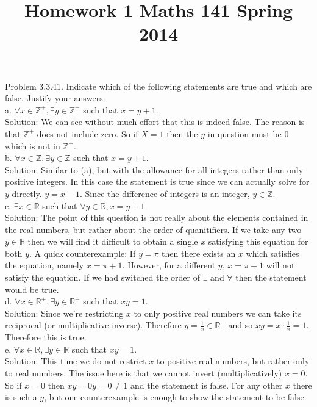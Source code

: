\documentclass[10 pt]{amsart}
\theoremstyle{definition}
\theoremstyle{remark}
\numberwithin{equation}{subsection}
\begin{document}
\title{Homework 1 Maths 141 Spring 2014}
\maketitle 
Problem 3.3.41. Indicate which of the following statements are true and which are false.  Justify your answers.\\

a. $\forall x \in \mathbb{Z}^{+}, \exists y \in \mathbb{Z}^{+}$ such that $x=y+1$.\\
Solution: We can see without much effort that this is indeed false.  The reason is that $\mathbb{Z}^{+}$ does not include zero.  So if $X=1$ then the $y$ in question must be $0$ which is not in $\mathbb{Z}^{+}$.\\

b. $\forall x \in \mathbb{Z}, \exists y \in \mathbb{Z}$ such that $x=y+1$.\\
Solution: Similar to (a), but with the allowance for all integers rather than only positive integers.  In this case the statement is true since we can actually solve for $y$ directly.
$y=x-1$.  Since the difference of integers is an integer, $y\in\mathbb{Z}$.\\

c. $\exists x \in\mathbb{R}$ such that $\forall y\in\mathbb{R}, x=y+1$.\\
Solution: The point of this question is not really about the elements contained in the real numbers, but rather about the order of quanitifiers.  If we take any two $y\in \mathbb{R}$ then we will find it difficult to obtain a single $x$ satisfying this equation for both $y$.  A quick counterexample:  If $y=\pi$ then there exists an $x$ which satisfies the equation, namely $x=\pi+1$.  However, for a different $y$, $x=\pi+1$ will not satisfy the equation.  If we had switched the order of $\exists$ and $\forall$ then the statement would be true.\\

d. $\forall x\in\mathbb{R}^{+}, \exists y\in\mathbb{R}^{+}$ such that $xy=1$.\\
Solution:  Since we're restricting $x$ to only positive real numbers we can take its reciprocal (or multiplicative inverse).  Therefore $y=\frac{1}{x}\in\mathbb{R}^{+}$ and so $xy = x\cdot\frac{1}{x} = 1$. Therefore this is true.\\

e. $\forall x\in\mathbb{R}, \exists y\in\mathbb{R}$ such that $xy=1$.\\
Solution: This time we do not restrict $x$ to positive real numbers, but rather only to real numbers.  The issue here is that we cannot invert (multiplicatively) $x=0$.  So if $x=0$ then $xy=0y=0\neq 1$ and the statement is false.  For any other $x$ there is such a $y$, but one counterexample is enough to show the statement to be false.\\
\end{document}
